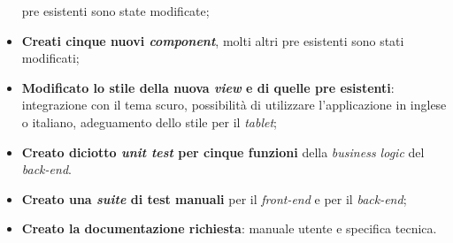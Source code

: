 \begin{itemize}
          pre esistenti sono state modificate;
    \item \textbf{Creati cinque nuovi \textit{component}}, molti altri pre esistenti sono stati modificati;
    \item \textbf{Modificato lo stile della nuova \textit{view} e di quelle pre esistenti}: integrazione con il tema scuro, possibilità
          di utilizzare l'applicazione in inglese o italiano, adeguamento dello stile per il \textit{tablet};
    \item \textbf{Creato diciotto \textit{unit test} per cinque funzioni} della \textit{business logic} del \textit{back-end}.
    \item \textbf{Creato una \textit{suite} di test manuali} per il \textit{front-end} e per il \textit{back-end};
    \item \textbf{Creato la documentazione richiesta}: manuale utente e specifica tecnica.
\end{itemize}
